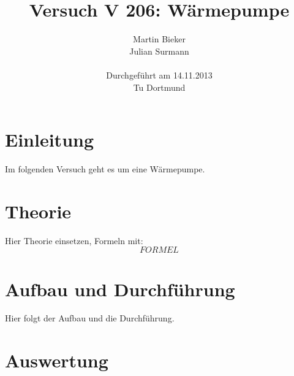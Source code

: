 \documentclass[11pt]{article}
\title{\textbf{Versuch V 206: Wärmepumpe}}
\author{Martin Bieker\\
		Julian Surmann\\
		\\
		Durchgef\"{u}hrt am 14.11.2013\\
		Tu Dortmund}
\date{}
\begin{document}
\renewcommand\tablename{Tabelle}
\renewcommand\figurename{Abbildung}
\maketitle
\thispagestyle{empty}
\newpage
\clearpage
\setcounter{page}{1}


\section{Einleitung}
Im folgenden Versuch geht es um eine Wärmepumpe.
\section{Theorie}
Hier Theorie einsetzen, Formeln mit:
\begin{equation}
F O R M E L  
\end{equation}
\section{Aufbau und Durchf\"{u}hrung}
Hier folgt der Aufbau und die Durchführung.
\section{Auswertung}
\end{document}
